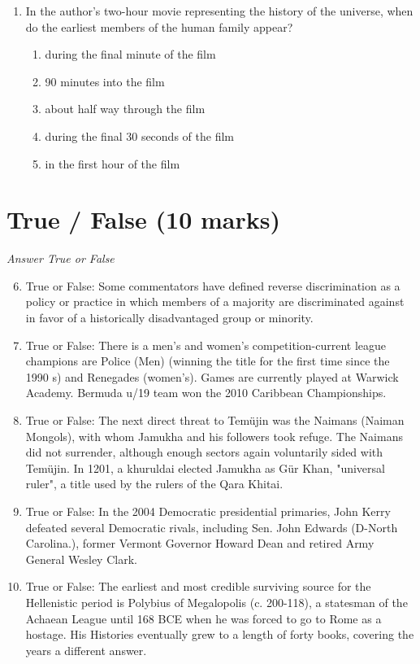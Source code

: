 \documentclass[12pt]{article}
\begin{document}
\begin{enumerate}[label=\arabic*.]
\begin{enumerate}[label=(\alph*)]
    \item coins recovered from ancient shipwrecks.
    \item dendrochronology.
    \item all of the above.
    \item ice core sampling.
    \item written records.
\end{enumerate}
\item In the author's two-hour movie representing the history of the universe, when do the earliest members of the human family appear?
\begin{enumerate}[label=(\alph*)]
    \item during the final minute of the film
    \item 90 minutes into the film
    \item about half way through the film
    \item during the final 30 seconds of the film
    \item in the first hour of the film
\end{enumerate}
\end{enumerate}

\section*{True / False (10 marks)}
\textit{Answer True or False}
\begin{enumerate}[label=\arabic*.]
\setcounter{enumi}{5}
\item True or False: Some commentators have defined reverse discrimination as a policy or practice in which members of a majority are discriminated against in favor of a historically disadvantaged group or minority.
\item True or False: There is a men's and women's competition-current league champions are Police (Men) (winning the title for the first time since the 1990 s) and Renegades (women's). Games are currently played at Warwick Academy. Bermuda u/19 team won the 2010 Caribbean Championships.
\item True or False: The next direct threat to Temüjin was the Naimans (Naiman Mongols), with whom Jamukha and his followers took refuge. The Naimans did not surrender, although enough sectors again voluntarily sided with Temüjin. In 1201, a khuruldai elected Jamukha as Gür Khan, "universal ruler", a title used by the rulers of the Qara Khitai.
\item True or False: In the 2004 Democratic presidential primaries, John Kerry defeated several Democratic rivals, including Sen. John Edwards (D-North Carolina.), former Vermont Governor Howard Dean and retired Army General Wesley Clark.
\item True or False: The earliest and most credible surviving source for the Hellenistic period is Polybius of Megalopolis (c. 200-118), a statesman of the Achaean League until 168 BCE when he was forced to go to Rome as a hostage. His Histories eventually grew to a length of forty books, covering the years a different answer.
\end{enumerate}
\end{document}
